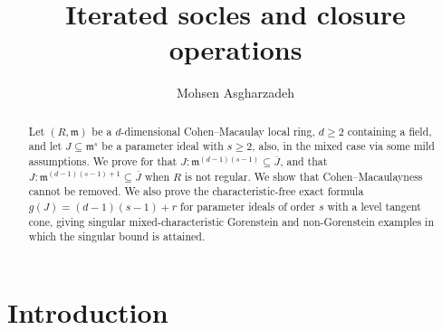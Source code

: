 \documentclass[11pt,a4paper]{amsart}
\numberwithin{equation}{section}
\newcommand{\m}{\mathfrak m}
\newcommand{\ol}[1]{\overline{#1}}
\begin{document}
	
\author[M. Asgharzadeh]{Mohsen Asgharzadeh}
\date{}


\address{M. Asgharzadeh}

 

	
	
	\title[Iterated socles and closure operations ]
{Iterated socles and closure operations }
	
	
	
	
	\begin{abstract}
  Let $(R,\m)$ be a $d$-dimensional Cohen--Macaulay local ring, $d\geq2$ containing a field,
  and let $J\subseteq\m^s$ be a parameter ideal with $s\geq2$,
also, in the mixed case via some mild assumptions. We prove for that
  $J:\m^{(d-1)(s-1)}\subseteq\ol J$, and that
  $J:\m^{(d-1)(s-1)+1}\subseteq\ol J$ when $R$ is not regular.  We 
  show that Cohen--Macaulayness cannot be removed.  We also prove the characteristic-free exact
  formula $g(J)=(d-1)(s-1)+r$ for parameter ideals of order $s$ with a
  level tangent cone, giving singular mixed-characteristic Gorenstein and
  non-Gorenstein examples in which the singular bound is attained.
\end{abstract}

	\maketitle

	\section{Introduction}
	\label{sec:intro}
 
 
 
 
 
 
\end{document}

